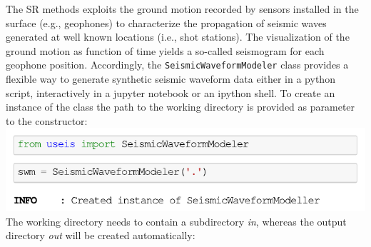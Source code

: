\documentclass[a4paper,fleqn]{cas-sc}
\begin{document}
The SR methods exploits the ground motion recorded by sensors installed in the surface (e.g., geophones) to characterize the propagation of seismic waves generated at well known locations (i.e., shot stations). 
The visualization of the ground motion as function of time yields a so-called seismogram for each geophone position.
Accordingly, the \texttt{SeismicWaveformModeler} class provides a flexible way to generate synthetic seismic waveform data either in a python script, interactively in a jupyter notebook or an ipython shell. To create an instance of the class the path to the working directory is provided as parameter to the constructor:
\newline
\includegraphics[width=.5\textwidth]{./figures/create_swm.pdf}
\newline
The working directory needs to contain a subdirectory \textit{in}, whereas the output directory \textit{out} will be created automatically:
\end{document}
